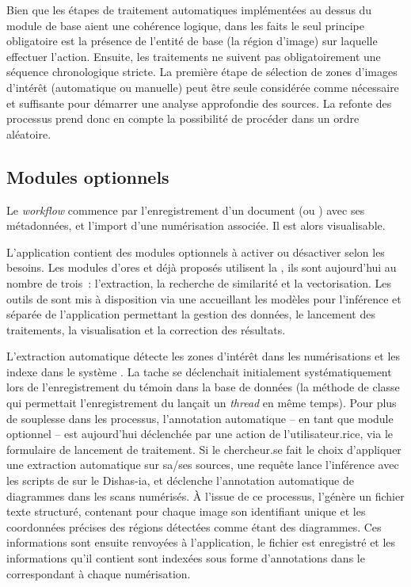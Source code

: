 Bien que les étapes de traitement automatiques implémentées au dessus du
module de base aient une cohérence logique, dans les faits le seul
principe obligatoire est la présence de l'entité de base (la région
d'image) sur laquelle effectuer l'action. Ensuite, les traitements ne
suivent pas obligatoirement une séquence chronologique stricte. La
première étape de sélection de zones d'images d'intérêt (automatique ou
manuelle) peut être seule considérée comme nécessaire et suffisante pour
démarrer une analyse approfondie des sources. La refonte des processus
prend donc en compte la possibilité de procéder dans un ordre aléatoire.

\hypertarget{modules-optionnels}{%
\subsection{Modules optionnels}\label{modules-optionnels}}

Le \textit{workflow} commence par l'enregistrement d'un document (\wit ou
\ser) avec ses métadonnées, et l'import d'une numérisation associée. Il
est alors visualisable.

L'application contient des modules optionnels à activer ou désactiver
selon les besoins. Les modules d'ores et déjà proposés utilisent la
\cv, ils sont aujourd'hui au nombre de trois~:
l'extraction, la recherche de similarité et la vectorisation. Les outils
de \dl sont mis à disposition via une \api accueillant
les modèles pour l'inférence et séparée de l'application permettant la
gestion des données, le lancement des traitements, la visualisation et
la correction des résultats.

L'extraction automatique détecte les zones d'intérêt dans les
numérisations et les indexe dans le système \sas. La tache se déclenchait
initialement systématiquement lors de l'enregistrement du témoin dans la
base de données (la méthode de classe qui permettait l'enregistrement du
\wit lançait un \emph{thread} en même temps). Pour plus de souplesse
dans les processus, l'annotation automatique -- en tant que module
optionnel -- est aujourd'hui déclenchée par une action de l'utilisateur.rice,
via le formulaire de lancement de traitement. Si le chercheur.se fait le
choix d'appliquer une extraction automatique sur sa/ses sources, une
requête \api lance l'inférence avec les scripts de \yolov sur le \gpu
Dishas-ia, et déclenche l'annotation automatique de diagrammes dans les
scans numérisés. À l'issue de ce processus, l'\api génère un fichier
texte structuré, contenant pour chaque image son identifiant unique et
les coordonnées précises des régions détectées comme étant des
diagrammes. Ces informations sont ensuite renvoyées à l'application, le
fichier est enregistré et les informations qu'il contient sont indexées
sous forme d'annotations dans le \man \iiif correspondant à chaque
numérisation.

